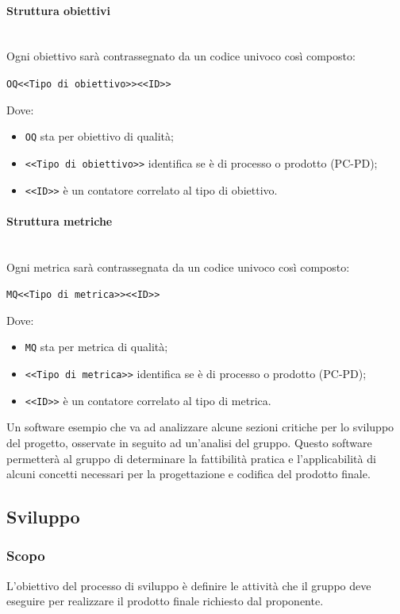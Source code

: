 \paragraph {Struttura obiettivi}\mbox{}\\
Ogni obiettivo sarà contrassegnato da un codice univoco così composto:
\begin{center}
	\verb|OQ<<Tipo di obiettivo>><<ID>>|
\end{center}
Dove:
\begin{itemize}
	\item \verb|OQ| sta per obiettivo di qualità;
	\item \verb|<<Tipo di obiettivo>>| identifica se è di processo o prodotto (PC-PD);
	\item \verb|<<ID>>| è un contatore correlato al tipo di obiettivo.
\end{itemize}
\paragraph {Struttura metriche}\mbox{}\\
Ogni metrica sarà contrassegnata da un codice univoco così composto:
\begin{center}
	\verb|MQ<<Tipo di metrica>><<ID>>|
\end{center}
Dove:
\begin{itemize}
	\item \verb|MQ| sta per metrica di qualità;
	\item \verb|<<Tipo di metrica>>| identifica se è di processo o prodotto (PC-PD);
	\item \verb|<<ID>>| è un contatore correlato al tipo di metrica.
\end{itemize}

Un software esempio che va ad analizzare alcune sezioni critiche per lo sviluppo del progetto, osservate in seguito ad un'analisi del gruppo. Questo software permetterà al gruppo di determinare la fattibilità pratica e l'applicabilità di alcuni concetti necessari per la progettazione e codifica del prodotto finale.


\subsection{Sviluppo}
    \subsubsection{Scopo}
    L'obiettivo del processo di sviluppo è definire le attività che il gruppo deve eseguire per realizzare il prodotto finale richiesto dal proponente.
